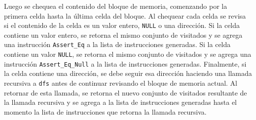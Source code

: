 Luego se chequea el contenido del bloque de memoria, comenzando por la primera celda hasta la última celda del bloque.
Al chequear cada celda se revisa si el contenido de la celda es un valor entero, \verb|NULL| o una dirección.
Si la celda contiene un valor entero, se retorna el mismo conjunto de visitados y se agrega una instrucción \verb|Assert_Eq| a la lista de instrucciones generadas.
Si la celda contiene un valor \verb|NULL|, se retorna el mismo conjunto de visitados y se agrega una instrucción \verb|Assert_Eq_Null| a la lista de instrucciones generadas.
Finalmente, si la celda contiene una dirección, se debe seguir esa dirección haciendo una llamada recursiva a \verb|dfs| antes de continuar revisando el bloque de memoria actual.
Al retornar de esta llamada, se retorna el nuevo conjunto de visitados resultante de la llamada recursiva y se agrega a la lista de instrucciones generadas hasta el momento la lista de instrucciones que retorna la llamada recursiva.
